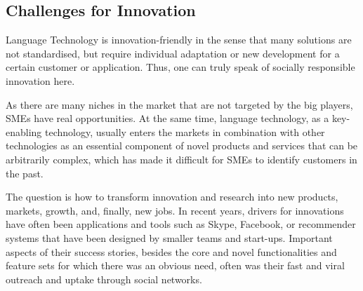 \documentclass[10pt, plain]{../../metanetpaper}
\begin{document}
\begin{multicols}{2}


\subsection{Challenges for Innovation}
\label{sec:powerf-mech-showcasing-and-innovation}


Language Technology is innovation-friendly in the sense that many solutions are not standardised, but require individual adaptation or new development for a certain customer or application. Thus, one can truly speak of socially responsible innovation here.

As there are many niches in the market that are not targeted by the big players, SMEs have real opportunities. At the same time, language technology, as a key-enabling technology, usually enters the markets in combination with other technologies as an essential component of novel products and services that can be arbitrarily complex, which has made it difficult for SMEs to identify customers in the past.

The question is how to transform innovation and research into new products, markets, growth, and, finally, new jobs. In recent years, drivers for innovations have often been applications and tools such as Skype, Facebook, or recommender systems that have been designed by smaller teams and start-ups. Important aspects of their success stories, besides the core and novel functionalities and feature sets for which there was an obvious need, often was their fast and viral outreach and uptake through social networks. 


\end{multicols}
\end{document}

